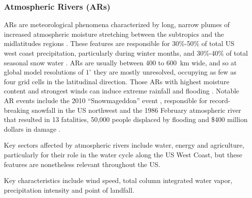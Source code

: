 \documentclass[11pt]{article}
\newcommand\citep{\cite}
\begin{document}
\subsubsection*{Atmospheric Rivers (ARs)}

ARs are meteorological phenomena characterized by long, narrow plumes of increased atmospheric moisture stretching between the subtropics and the midlatitudes regions \citep{ralph2011storms}.  These features are responsible for 30\%-50\% of total US west coast precipitation, particularly during winter months, and 30\%-40\% of total seasonal snow water \citep{dettinger2011atmospheric, warner2012wintertime}.  ARs are usually between 400 to 600\ km wide, and so at global model resolutions of $1^\circ$ {\color{blue}they}  are mostly unresolved, occupying as few as four grid cells in the latitudinal direction.  Those ARs with highest moisture content and strongest winds can induce extreme rainfall {\color{blue}and flooding} .  Notable AR events include the 2010 ``Snowmageddon'' event \citep{halverson2010mega}, responsible for record-breaking snowfall in the US northwest and the 1986 February atmospheric river that resulted in 13 fatalities, 50,000 people displaced by flooding and \$400 million dollars in damage \citep{leung2009atmospheric}.






Key sectors affected by atmospheric rivers include water, energy and agriculture, particularly for their role in the water cycle along the US West Coast, but these features are nonetheless relevant throughout the US.

Key characteristics include wind speed, total column integrated water vapor, precipitation intensity and point of landfall.
\end{document}
